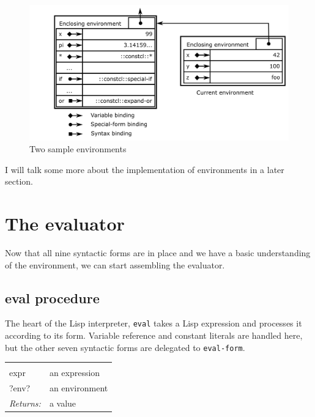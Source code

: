 \documentclass[twoside]{report}
\begin{document}
\begin{figure}[h!]\includegraphics{images/environments.png}\captionsetup{labelformat=empty}\caption{Two sample environments}\label{fig:two-sample-environments}\end{figure}

I will talk some more about the implementation of environments in a later section.

\section{The evaluator}
\label{the-evaluator}

Now that all nine syntactic forms are in place and we have a basic understanding of the environment, we can start assembling the evaluator.

\subsection{eval procedure}
\label{eval-procedure}

The heart of the Lisp interpreter, \texttt{eval} takes a Lisp expression and processes it according to its form. Variable reference and constant literals are handled here, but the other seven syntactic forms are delegated to \texttt{eval-form}.

\noindent\begin{tabular}{ |p{1.9cm} p{8cm}| }
\hline
\rowcolor[HTML]{CCCCCC} \multicolumn{2}{|l|}{\bf eval (public)} \\
expr & an expression \\
?env? & an environment \\
\textit{Returns:} & a value \\
\hline
\end{tabular}
\end{document}
